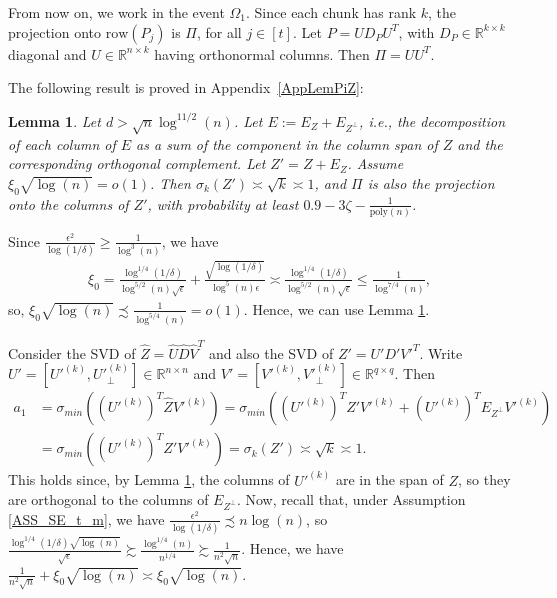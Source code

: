 \documentclass{article}
\newtheorem{lemma}{Lemma}
\begin{document}
From now on, we work in the event $\Omega_1$. Since each chunk has rank $k$, the projection onto $\text{row}(P_j)$ is $\Pi$, for all $j \in [t]$. Let $P = UD_PU^T$, with $D_P \in \mathbb{R}^{k \times k}$ diagonal and $U \in \mathbb{R}^{n \times k}$ having orthonormal columns. Then $\Pi = UU^T$.


The following result is proved in Appendix~\ref{AppLemPiZ}:

\begin{lemma}
\label{lemma:Pi_Z}
Let $d > \sqrt{n}\log^{11/2}(n)$. Let $E := E_Z + E_{Z^{\perp}}$, i.e., the decomposition of each column of $E$ as a sum of the component in the column span of $Z$ and the corresponding orthogonal complement. Let $Z' = Z + E_Z$. Assume $\xi_0\sqrt{\log(n)} = o(1)$. Then $\sigma_k(Z') \asymp \sqrt{k} \asymp 1$, and $\Pi$ is also the projection onto the columns of $Z'$, with probability at least $0.9 - 3\zeta - \frac{1}{\mathrm{poly}(n)}$.
\end{lemma}

Since $\frac{\epsilon^2}{\log(1/\delta)} \geq \frac{1}{\log^3(n)}$, we have
\begin{align*}
\xi_0 = \frac{\log^{1/4}(1/\delta)}{\log^{5/2}(n)\sqrt{\epsilon}} + \frac{\sqrt{\log(1/\delta)}}{\log^5(n)\epsilon} \asymp \frac{\log^{1/4}(1/\delta)}{\log^{5/2}(n)\sqrt{\epsilon}} \leq \frac{1}{\log^{7/4}(n)},
\end{align*}
so, $\xi_0\sqrt{\log(n)} \precsim \frac{1}{\log^{5/4}(n)} = o(1)$. Hence, we can use Lemma \ref{lemma:Pi_Z}.

Consider the SVD of $\hat{Z} = \hat{U}\hat{D}\hat{V}^T$ and also the SVD of $Z' = U'D'V'^T$. Write $U' = \left[U'^{(k)}, U'^{(k)}_{\perp}\right] \in \mathbb{R}^{n \times n}$ and $V' = \left[V'^{(k)}, V'^{(k)}_{\perp}\right] \in \mathbb{R}^{q \times q}$. Then
\begin{align*}
a_1 &= \sigma_{min}\left((U'^{(k)})^T\hat{Z}V'^{(k)}\right) = \sigma_{min}\left((U'^{(k)})^TZ'V'^{(k)} + (U'^{(k)})^TE_{Z^{\perp}}V'^{(k)}\right)\\
&= \sigma_{min}\left((U'^{(k)})^TZ'V'^{(k)}\right) = \sigma_k(Z') \asymp \sqrt{k} \asymp 1.
\end{align*}
This holds since, by Lemma \ref{lemma:Pi_Z}, the columns of $U'^{(k)}$ are in the span of $Z$, so they are orthogonal to the columns of $E_{Z^{\perp}}$. Now, recall that, under Assumption \ref{ASS_SE_t_m}, we have $\frac{\epsilon^2}{\log(1/\delta)} \precsim n\log(n)$, so $\frac{\log^{1/4}(1/\delta)\sqrt{\log(n)}}{\sqrt{\epsilon}} \succsim \frac{\log^{1/4}(n)}{n^{1/4}} \succsim \frac{1}{n^2\sqrt{n}}$. Hence, we have $\frac{1}{n^2\sqrt{n}} + \xi_0\sqrt{\log(n)} \asymp \xi_0\sqrt{\log(n)}$.
\end{document}
